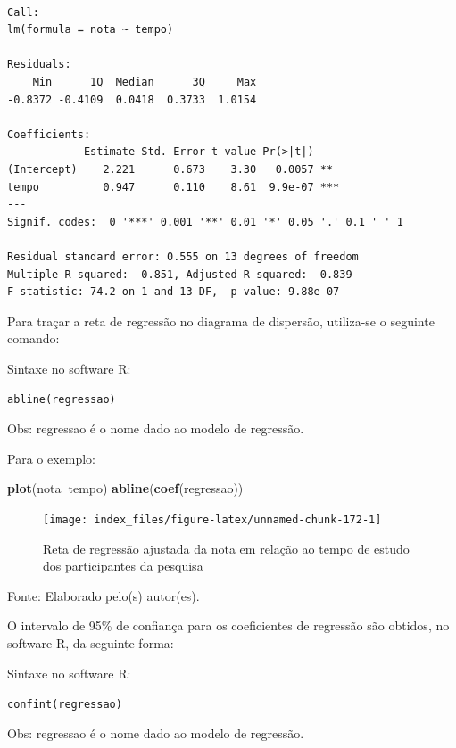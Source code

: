 \documentclass[12pt,brazil,oneside]{book}
\newenvironment{Shaded}{\begin{snugshade}}{\end{snugshade}}
\newcommand{\KeywordTok}[1]{\textcolor[rgb]{0.13,0.29,0.53}{\textbf{#1}}}
\newcommand{\NormalTok}[1]{#1}
\newcommand{\OperatorTok}[1]{\textcolor[rgb]{0.81,0.36,0.00}{\textbf{#1}}}
\begin{document}
\begin{verbatim}

Call:
lm(formula = nota ~ tempo)

Residuals:
    Min      1Q  Median      3Q     Max 
-0.8372 -0.4109  0.0418  0.3733  1.0154 

Coefficients:
            Estimate Std. Error t value Pr(>|t|)    
(Intercept)    2.221      0.673    3.30   0.0057 ** 
tempo          0.947      0.110    8.61  9.9e-07 ***
---
Signif. codes:  0 '***' 0.001 '**' 0.01 '*' 0.05 '.' 0.1 ' ' 1

Residual standard error: 0.555 on 13 degrees of freedom
Multiple R-squared:  0.851, Adjusted R-squared:  0.839 
F-statistic: 74.2 on 1 and 13 DF,  p-value: 9.88e-07
\end{verbatim}

Para traçar a reta de regressão no diagrama de dispersão, utiliza-se o seguinte comando:

Sintaxe no software R:

\texttt{abline(regressao)}

Obs: regressao é o nome dado ao modelo de regressão.

Para o exemplo:

\begin{Shaded}
\begin{Highlighting}[]
\KeywordTok{plot}\NormalTok{(nota}\OperatorTok{~}\NormalTok{tempo)}
\KeywordTok{abline}\NormalTok{(}\KeywordTok{coef}\NormalTok{(regressao))}
\end{Highlighting}
\end{Shaded}

\begin{figure}[H]

{\centering \texttt{[image: index\_files/figure-latex/unnamed-chunk-172-1]} 

}

\caption{Reta de regressão ajustada da nota em relação ao tempo de estudo dos participantes da pesquisa}\label{fig:unnamed-chunk-172}
\end{figure}

Fonte: Elaborado pelo(s) autor(es).

O intervalo de 95\% de confiança para os coeficientes de regressão são obtidos, no software R, da seguinte forma:

Sintaxe no software R:

\texttt{confint(regressao)}

Obs: regressao é o nome dado ao modelo de regressão.
\end{document}
